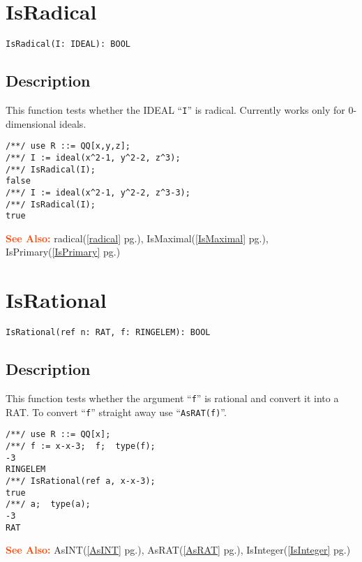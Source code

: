\documentclass[a4paper]{mybook}
\newenvironment{command}{}{} %
\newcommand\SeeAlso{\par\textcolor{OrangeRed}{\textbf{\large See Also: }}}
\begin{document}
\section{IsRadical}
\label{IsRadical}
\begin{command} %


\begin{Verbatim}[label=syntax, rulecolor=\color{MidnightBlue},
frame=single]
IsRadical(I: IDEAL): BOOL
\end{Verbatim}


\subsection*{Description}

This function tests whether the IDEAL ``\verb&I&'' is radical.
Currently works only for 0-dimensional ideals.
\begin{Verbatim}[label=example, rulecolor=\color{PineGreen}, frame=single]
/**/ use R ::= QQ[x,y,z];
/**/ I := ideal(x^2-1, y^2-2, z^3);
/**/ IsRadical(I);
false
/**/ I := ideal(x^2-1, y^2-2, z^3-3);
/**/ IsRadical(I);
true
\end{Verbatim}


\SeeAlso %
  radical(\ref{radical} pg.\pageref{radical}), 
    IsMaximal(\ref{IsMaximal} pg.\pageref{IsMaximal}), 
    IsPrimary(\ref{IsPrimary} pg.\pageref{IsPrimary})
\end{command} %

\section{IsRational}
\label{IsRational}
\begin{command} %


\begin{Verbatim}[label=syntax, rulecolor=\color{MidnightBlue},
frame=single]
IsRational(ref n: RAT, f: RINGELEM): BOOL
\end{Verbatim}


\subsection*{Description}

This function tests whether the argument ``\verb&f&'' is rational and
convert it into a RAT.
To convert ``\verb&f&'' straight away use ``\verb&AsRAT(f)&''.
\begin{Verbatim}[label=example, rulecolor=\color{PineGreen}, frame=single]
/**/ use R ::= QQ[x];
/**/ f := x-x-3;  f;  type(f);
-3
RINGELEM
/**/ IsRational(ref a, x-x-3);
true
/**/ a;  type(a);
-3
RAT
\end{Verbatim}


\SeeAlso %
  AsINT(\ref{AsINT} pg.\pageref{AsINT}), 
    AsRAT(\ref{AsRAT} pg.\pageref{AsRAT}), 
    IsInteger(\ref{IsInteger} pg.\pageref{IsInteger})
\end{command} %
\end{document}
